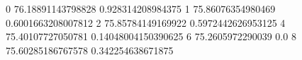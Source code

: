 0 76.18891143798828 0.928314208984375
1 75.86076354980469 0.6001663208007812
2 75.85784149169922 0.5972442626953125
4 75.40107727050781 0.14048004150390625
6 75.2605972290039 0.0
8 75.60285186767578 0.342254638671875
